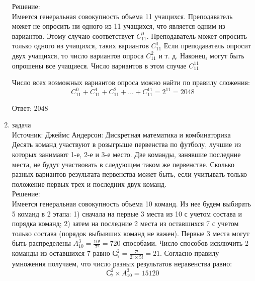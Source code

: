 \documentclass[a4paper,14pt]{extreport} %
\begin{document}
\begin{center}
\begin{enumerate}
						Решение:\\
						Имеется генеральная совокупность объема 11 учащихся.
						Преподаватель может не опросить ни одного из 11 учащихся, что
						является одним из вариантов. Этому случаю соответствует $C_{11}^0$.
						Преподаватель может опросить только одного из учащихся, таких
						вариантов $C_{11}^1$
						Если преподаватель опросит двух учащихся, то число
						вариантов опроса $C_{11}^2$ и т. д.
						Наконец, могут быть опрошены все учащиеся. Число
						вариантов в этом случае $C_{11}^{11}$
						
						Число всех возможных вариантов опроса можно найти по правилу
						сложения:
						\begin{equation}
							C_{11}^0 + C_{11}^1 + C_{11}^2 + \ldots  + C_{11}^11 = 2^{11} = 2048
						\end{equation}
						
						Ответ: 2048
						
						\item {\large задача  }\\
						Источник: Джеймс Андерсон: Дискретная математика и комбинаторика\\
						\vspace{15pt}
						Десять команд участвуют в розыгрыше первенства по
						футболу, лучшие из которых занимают 1-е, 2-е и 3-е место. Две
						команды, занявшие последние места, не будут участвовать в
						следующем таком же первенстве. Сколько разных вариантов
						результата первенства может быть, если учитывать только положение
						первых трех и последних двух команд.\\
						
					
						\vspace{15pt}
						Решение:\\
						 Имеется генеральная совокупность объема 10
						команд. Из нее будем выбирать 5 команд в 2 этапа:
						1) сначала на первые 3 места из 10 с учетом состава и порядка
						команд;
						2) затем на последние 2 места из оставшихся 7 с учетом только
						состава (порядок выбывших команд не важен). Первые 3 места могут
						быть распределены $A_{10}^3 = \frac{10!}{7!}= 720$ способами.						
						Число способов исключить 2 команды из оставшихся 7 равно $С_{7}^2 = \frac{7!}{2!\times5!}= 21$.
						Согласно правилу умножения получаем, что число разных результатов неравенства равно:
						\begin{equation}
							С_{7}^2 \times A_{10}^3 = 15120
						\end{equation}
						

\end{enumerate}
\end{center}
\end{document}
